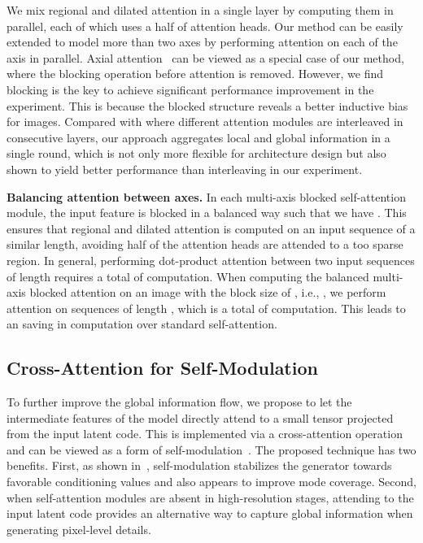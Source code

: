 \documentclass{article}
\newcommand{\p}[1]{\textbf{#1.}}
\begin{document}
We mix regional and dilated attention in a single layer by computing them in parallel, each of which uses a half of attention heads. Our method can be easily extended to model more than two axes by performing attention on each of the axis in parallel. Axial attention~\cite{ho2019axial,huang2019ccnet,wang2020axial} can be viewed as a special case of our method, where the blocking operation before attention is removed. However, we find blocking is the key to achieve significant performance improvement in the experiment. This is because the blocked structure reveals a better inductive bias for images. Compared with \cite{ho2019axial,liu2021swin,wang2020axial} where different attention modules are interleaved in consecutive layers, our approach aggregates local and global information in a single round, which is not only more flexible for architecture design but also shown to yield better performance than interleaving in our experiment.

\p{Balancing attention between axes} In each multi-axis blocked self-attention module, the input feature is blocked in a balanced way such that we have . This ensures that regional and dilated attention is computed on an input sequence of a similar length, avoiding half of the attention heads are attended to a too sparse region. In general, performing dot-product attention between two input sequences of length  requires a total of  computation. When computing the balanced multi-axis blocked attention on an image with the block size of , i.e., , we perform attention on  sequences of length , which is a total of  computation. This leads to an  saving in computation over standard self-attention.



\subsection{Cross-Attention for Self-Modulation}

To further improve the global information flow, we propose to let the intermediate features of the model directly attend to a small tensor projected from the input latent code. This is implemented via a cross-attention operation and can be viewed as a form of self-modulation~\cite{chen2019self}. The proposed technique has two benefits. First, as shown in~\cite{chen2019self}, self-modulation stabilizes the generator towards favorable conditioning values and also appears to improve mode coverage. Second, when self-attention modules are absent in high-resolution stages, attending to the input latent code provides an alternative way to capture global information when generating pixel-level details.
\end{document}
